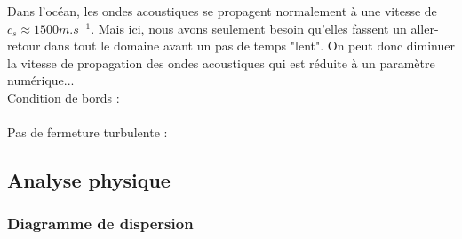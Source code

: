 \documentclass[a4paper,12pt]{article}
\begin{document}
    Dans l'océan, les ondes acoustiques se propagent normalement à une vitesse de $c_s \approx 1500 m.s^{-1}$. Mais ici, nous avons seulement besoin qu'elles fassent un aller-retour dans tout le domaine avant un pas de temps "lent". On peut donc diminuer la vitesse de propagation des ondes acoustiques qui est réduite à un paramètre numérique... \\
    \newline
    Condition de bords :\\
     \\
    \newline
    Pas de fermeture turbulente :\\

    \subsection{Analyse physique}
    
        \subsubsection{Diagramme de dispersion}
        
\end{document}
